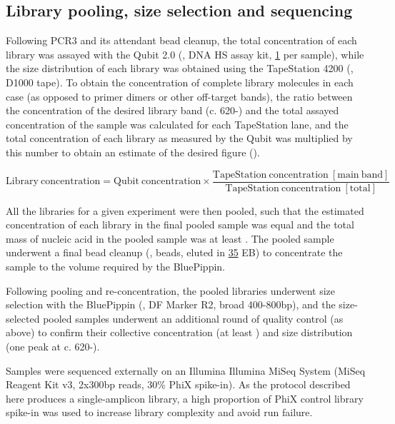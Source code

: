 \subsection{Library pooling, size selection and sequencing} 
\label{sec:methods_molec_igseq_seq}

Following PCR3 and its attendant bead cleanup, the total concentration of each library was assayed with the Qubit 2.0 (, DNA HS assay kit, \ul{1} per sample), while the size distribution of each library was obtained using the TapeStation 4200 (, D1000 tape). To obtain the concentration of complete library molecules in each case (as opposed to primer dimers or other off-target bands), the ratio between the concentration of the desired library band (c. 620-) and the total assayed concentration of the sample was calculated for each TapeStation lane, and the total concentration of each library as measured by the Qubit was multiplied by this number to obtain an estimate of the desired figure ().

\begin{equation}
\mathrm{Library~concentration} = \mathrm{Qubit~concentration} \times \frac{\mathrm{TapeStation~concentration~[main~band]}}{\mathrm{TapeStation~concentration~[total]}}
\label{eq:library-conc}
\end{equation}

All the libraries for a given experiment were then pooled, such that the estimated concentration of each library in the final pooled sample was equal and the total mass of nucleic acid in the pooled sample was at least . The pooled sample underwent a final bead cleanup (,  beads, eluted in \ul{35} EB) to concentrate the sample to the volume required by the BluePippin.

Following pooling and re-concentration, the pooled libraries underwent size selection with the BluePippin (,  DF Marker R2, broad 400-800bp), and the size-selected pooled samples underwent an additional round of quality control (as above) to confirm their collective concentration (at least ) and size distribution (one peak at c. 620-). 

Samples were sequenced externally on an Illumina Illumina MiSeq System (MiSeq Reagent Kit v3, 2x300bp reads, 30\% PhiX spike-in). As the protocol described here produces a single-amplicon library, a high proportion of PhiX control library spike-in was used to increase library complexity and avoid run failure. %
